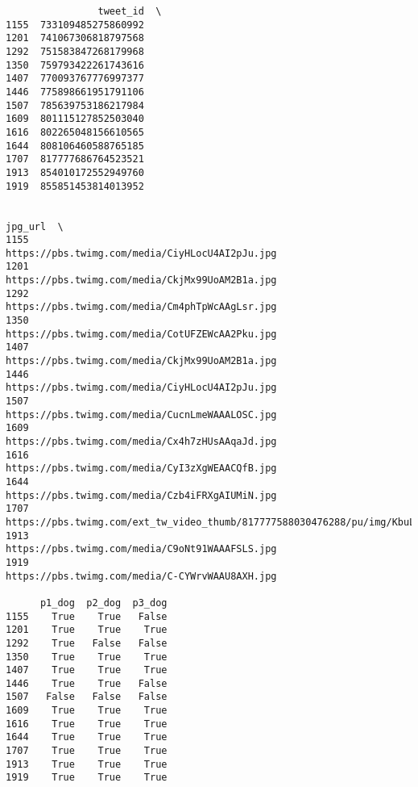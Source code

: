 \documentclass[11pt]{article}
\begin{document}
    
    \begin{verbatim}
                tweet_id  \
1155  733109485275860992   
1201  741067306818797568   
1292  751583847268179968   
1350  759793422261743616   
1407  770093767776997377   
1446  775898661951791106   
1507  785639753186217984   
1609  801115127852503040   
1616  802265048156610565   
1644  808106460588765185   
1707  817777686764523521   
1913  854010172552949760   
1919  855851453814013952   

                                                                                      jpg_url  \
1155                                          https://pbs.twimg.com/media/CiyHLocU4AI2pJu.jpg   
1201                                          https://pbs.twimg.com/media/CkjMx99UoAM2B1a.jpg   
1292                                          https://pbs.twimg.com/media/Cm4phTpWcAAgLsr.jpg   
1350                                          https://pbs.twimg.com/media/CotUFZEWcAA2Pku.jpg   
1407                                          https://pbs.twimg.com/media/CkjMx99UoAM2B1a.jpg   
1446                                          https://pbs.twimg.com/media/CiyHLocU4AI2pJu.jpg   
1507                                          https://pbs.twimg.com/media/CucnLmeWAAALOSC.jpg   
1609                                          https://pbs.twimg.com/media/Cx4h7zHUsAAqaJd.jpg   
1616                                          https://pbs.twimg.com/media/CyI3zXgWEAACQfB.jpg   
1644                                          https://pbs.twimg.com/media/Czb4iFRXgAIUMiN.jpg   
1707  https://pbs.twimg.com/ext_tw_video_thumb/817777588030476288/pu/img/KbuLpE4krHF4VdPf.jpg   
1913                                          https://pbs.twimg.com/media/C9oNt91WAAAFSLS.jpg   
1919                                          https://pbs.twimg.com/media/C-CYWrvWAAU8AXH.jpg   

      p1_dog  p2_dog  p3_dog  
1155    True    True   False  
1201    True    True    True  
1292    True   False   False  
1350    True    True    True  
1407    True    True    True  
1446    True    True   False  
1507   False   False   False  
1609    True    True    True  
1616    True    True    True  
1644    True    True    True  
1707    True    True    True  
1913    True    True    True  
1919    True    True    True  
    \end{verbatim}
\end{document}

